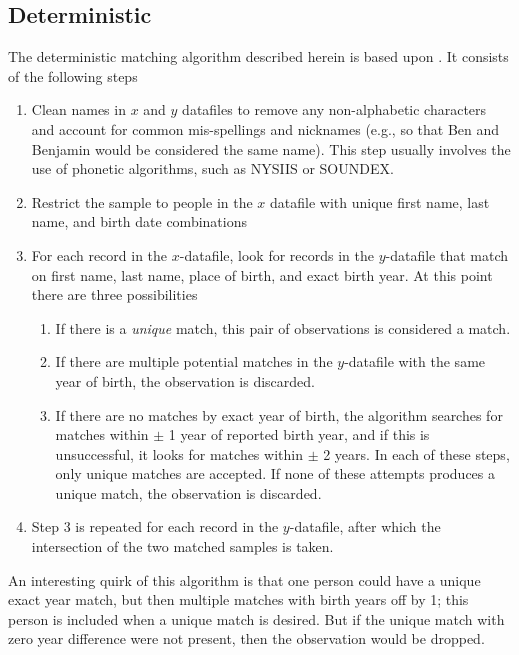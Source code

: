 \documentclass[12pt]{article}
\begin{document}
\subsection{Deterministic}
The deterministic matching algorithm described herein is based upon \cite{abe2012}.  It consists of the following steps
\begin{enumerate}
\item Clean names in $x$ and $y$ datafiles to remove any non-alphabetic characters and account for common mis-spellings and nicknames (e.g., so that Ben and Benjamin would be considered the same name).  This step usually involves the use of phonetic algorithms, such as NYSIIS or SOUNDEX.   
\item Restrict the sample to people in the $x$ datafile with unique first name, last name, and birth date combinations  
\item For each record in the $x$-datafile, look for records in the $y$-datafile that match on first name, last name, place of birth, and exact birth year.  At this point there are three possibilities 
\begin{enumerate}
\item If there is a \textit{unique} match, this pair of observations is considered a match.
\item If there are multiple potential matches in the $y$-datafile with the same year of birth, the observation is discarded. 
\item If there are no matches by exact year of birth, the algorithm searches for matches within $\pm$ 1 year of reported birth year, and if this is unsuccessful, it looks for matches within $\pm$ 2 years.  In each of these steps, only unique matches are accepted.  If none of these attempts produces a unique match, the observation is discarded.
\end{enumerate}
\item Step 3 is repeated for each record in the $y$-datafile, after which the intersection of the two matched samples is taken. 
\end{enumerate}

An interesting quirk of this algorithm is that one person could have a unique exact year match, but then multiple matches with birth years off by 1; this person is included when a unique match is desired.  But if the unique match with zero year difference were not present, then the observation would be dropped. 
\end{document}
